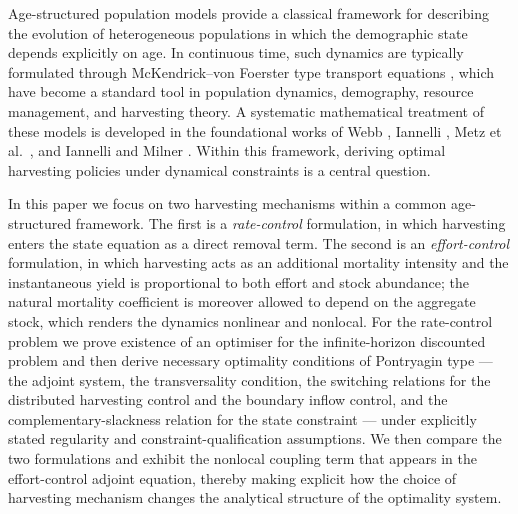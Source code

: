 \documentclass[pdflatex,sn-mathphys-num]{sn-jnl}
\theoremstyle{definition}
\theoremstyle{remark}
\begin{document}
Age-structured population models provide a classical framework for
describing the evolution of heterogeneous populations in which the
demographic state depends explicitly on age. In continuous time, such
dynamics are typically formulated through McKendrick--von Foerster type
transport equations
\citep{mkendrick_applications_1925,von_foerster_remarks_1959,liu2025bidirectional}, which have
become a standard tool in population dynamics, demography, resource
management, and harvesting theory. A systematic mathematical treatment of
these models is developed in the foundational works of Webb
\citep{webb_semigroup_1984,webb_theory_1985,liang2026separation}, Iannelli
\citep{iannelli_mathematical_1995}, Metz et al.\
\citep{metz_dynamics_1986}, and Iannelli and Milner
\citep{iannelli_basic_2017}. Within this framework, deriving optimal
harvesting policies under dynamical constraints is a central question.

In this paper we focus on two harvesting mechanisms within a common
age-structured framework. The first is a \emph{rate-control} formulation,
in which harvesting enters the state equation as a direct removal term. The
second is an \emph{effort-control} formulation, in which harvesting acts as
an additional mortality intensity and the instantaneous yield is
proportional to both effort and stock abundance; the natural mortality
coefficient is moreover allowed to depend on the aggregate stock, which
renders the dynamics nonlinear and nonlocal. For the rate-control problem we
prove existence of an optimiser for the infinite-horizon discounted problem
and then derive necessary optimality conditions of Pontryagin type --- the
adjoint system, the transversality condition, the switching relations for
the distributed harvesting control and the boundary inflow control, and the
complementary-slackness relation for the state constraint --- under
explicitly stated regularity and constraint-qualification assumptions. We
then compare the two formulations and exhibit the nonlocal coupling term
that appears in the effort-control adjoint equation, thereby making explicit
how the choice of harvesting mechanism changes the analytical structure of
the optimality system.
\end{document}
